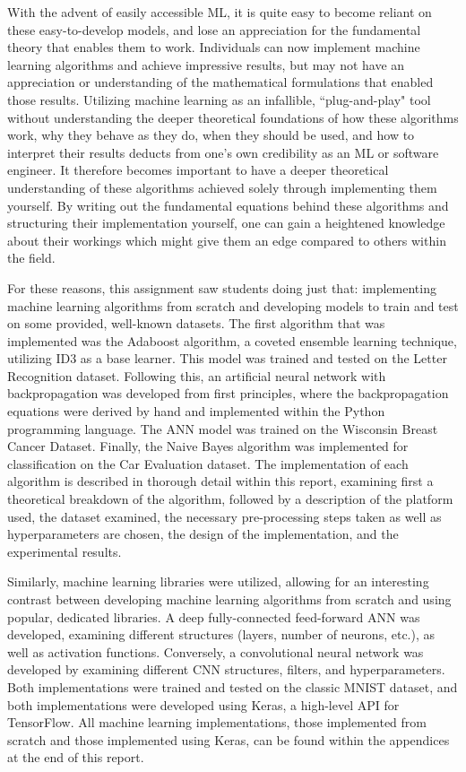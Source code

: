 \documentclass[a4paper]{article}
\begin{document}
With the advent of easily accessible ML, it is quite easy to become reliant on these easy-to-develop models, and lose an appreciation for the fundamental theory that enables them to work. Individuals can now implement machine learning algorithms and achieve impressive results, but may not have an appreciation or understanding of the mathematical formulations that enabled those results. Utilizing machine learning as an infallible, ``plug-and-play" tool without understanding the deeper theoretical foundations of how these algorithms work, why they behave as they do, when they should be used, and how to interpret their results deducts from one's own credibility as an ML or software engineer. It therefore becomes important to have a deeper theoretical understanding of these algorithms achieved solely through implementing them yourself. By writing out the fundamental equations behind these algorithms and structuring their implementation yourself, one can gain a heightened knowledge about their workings which might give them an edge compared to others within the field. 

For these reasons, this assignment saw students doing just that: implementing machine learning algorithms from scratch and developing models to train and test on some provided, well-known datasets. The first algorithm that was implemented was the Adaboost algorithm, a coveted ensemble learning technique, utilizing ID3 as a base learner. This model was trained and tested on the Letter Recognition dataset. Following this, an artificial neural network with backpropagation was developed from first principles, where the backpropagation equations were derived by hand and implemented within the Python programming language. The ANN model was trained on the Wisconsin Breast Cancer Dataset. Finally, the Naive Bayes algorithm was implemented for classification on the Car Evaluation dataset. The implementation of each algorithm is described in thorough detail within this report, examining first a theoretical breakdown of the algorithm, followed by a description of the platform used, the dataset examined, the necessary pre-processing steps taken as well as hyperparameters are chosen, the design of the implementation, and the experimental results.

Similarly, machine learning libraries were utilized, allowing for an interesting contrast between developing machine learning algorithms from scratch and using popular, dedicated libraries. A deep fully-connected feed-forward ANN was developed, examining different structures (layers, number of neurons, etc.), as well as activation functions. Conversely, a convolutional neural network was developed by examining different CNN structures, filters, and hyperparameters. Both implementations were trained and tested on the classic MNIST dataset, and both implementations were developed using Keras, a high-level API for TensorFlow. All machine learning implementations, those implemented from scratch and those implemented using Keras, can be found within the appendices at the end of this report. 
\end{document}
